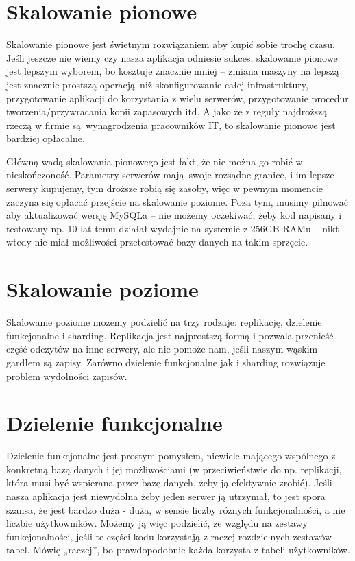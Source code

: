 \documentclass[a4paper,12pt]{article}
\begin{document}
\section{Skalowanie pionowe}

Skalowanie pionowe jest świetnym rozwiązaniem aby kupić sobie trochę czasu. Jeśli jeszcze nie wiemy czy nasza aplikacja odniesie sukces, skalowanie pionowe jest lepszym wyborem, bo kosztuje znacznie mniej – zmiana maszyny na lepszą jest znacznie prostszą operacją niż skonfigurowanie całej infrastruktury, przygotowanie aplikacji do korzystania z wielu serwerów, przygotowanie procedur tworzenia/przywracania kopii zapasowych itd. A jako że z reguły najdroższą rzeczą w firmie są wynagrodzenia pracowników IT, to skalowanie pionowe jest bardziej opłacalne.

Główną wadą skalowania pionowego jest fakt, że nie można go robić w nieskończoność. Parametry serwerów mają swoje rozsądne granice, i im lepsze serwery kupujemy, tym droższe robią się zasoby, więc w pewnym momencie zaczyna się opłacać przejście na skalowanie poziome. Poza tym, musimy pilnować aby aktualizować wersję MySQLa – nie możemy oczekiwać, żeby kod napisany i testowany np. 10 lat temu działał wydajnie na systemie z 256GB RAMu – nikt wtedy nie miał możliwości przetestować bazy danych na takim sprzęcie.

\section{Skalowanie poziome}

Skalowanie poziome możemy podzielić na trzy rodzaje: replikację, dzielenie funkcjonalne i sharding. Replikacja jest najprostszą formą i pozwala przenieść część odczytów na inne serwery, ale nie pomoże nam, jeśli naszym wąskim gardłem są zapisy. Zarówno dzielenie funkcjonalne jak i sharding rozwiązuje problem wydolności zapisów.

\section{Dzielenie funkcjonalne}

Dzielenie funkcjonalne jest prostym pomysłem, niewiele mającego wspólnego z konkretną bazą danych i jej możliwościami (w przeciwieństwie do np. replikacji, która musi być wspierana przez bazę danych, żeby ją efektywnie zrobić). Jeśli nasza aplikacja jest niewydolna żeby jeden serwer ją utrzymał, to jest spora szansa, że jest bardzo duża - duża, w sensie liczby różnych funkcjonalności, a nie liczbie użytkowników. Możemy ją więc podzielić, ze względu na 	zestawy funkcjonalności, jeśli te części kodu korzystają z raczej rozdzielnych zestawów tabel. Mówię „raczej”, bo prawdopodobnie każda korzysta z tabeli użytkowników.
\end{document}
